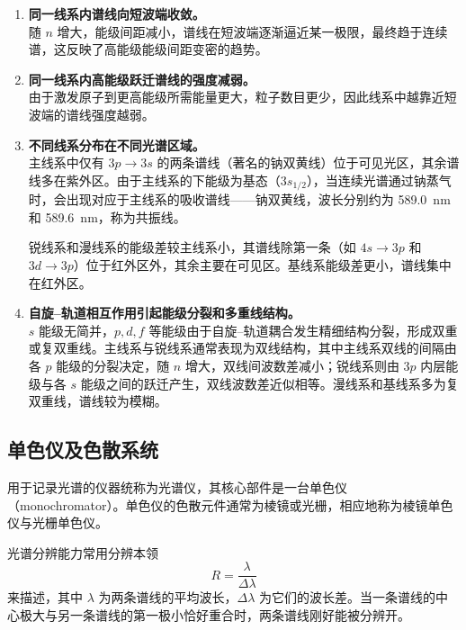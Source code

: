 \documentclass[a4paper,8pt,twocolumn]{article}
\begin{document}
\begin{enumerate}[label=(\arabic*)]
  \item \textbf{同一线系内谱线向短波端收敛。}\\
  随 $n$ 增大，能级间距减小，谱线在短波端逐渐逼近某一极限，最终趋于连续谱，这反映了高能级能级间距变密的趋势。

  \item \textbf{同一线系内高能级跃迁谱线的强度减弱。}\\
  由于激发原子到更高能级所需能量更大，粒子数目更少，因此线系中越靠近短波端的谱线强度越弱。

  \item \textbf{不同线系分布在不同光谱区域。}\\
  主线系中仅有 $3p \rightarrow 3s$ 的两条谱线（著名的钠双黄线）位于可见光区，其余谱线多在紫外区。由于主线系的下能级为基态（$3s_{1/2}$），当连续光谱通过钠蒸气时，会出现对应于主线系的吸收谱线——钠双黄线，波长分别约为 \SI{589.0}{\nano\meter} 和 \SI{589.6}{\nano\meter}，称为共振线。

  锐线系和漫线系的能级差较主线系小，其谱线除第一条（如 $4s\rightarrow 3p$ 和 $3d\rightarrow 3p$）位于红外区外，其余主要在可见区。基线系能级差更小，谱线集中在红外区。

  \item \textbf{自旋–轨道相互作用引起能级分裂和多重线结构。}\\
  $s$ 能级无简并，$p,d,f$ 等能级由于自旋–轨道耦合发生精细结构分裂，形成双重或复双重线。主线系与锐线系通常表现为双线结构，其中主线系双线的间隔由各 $p$ 能级的分裂决定，随 $n$ 增大，双线间波数差减小；锐线系则由 $3p$ 内层能级与各 $s$ 能级之间的跃迁产生，双线波数差近似相等。漫线系和基线系多为复双重线，谱线较为模糊。
\end{enumerate}

\subsection{单色仪及色散系统}

用于记录光谱的仪器统称为光谱仪，其核心部件是一台单色仪（monochromator）。单色仪的色散元件通常为棱镜或光栅，相应地称为棱镜单色仪与光栅单色仪。

光谱分辨能力常用分辨本领
\begin{equation}
  R = \frac{\lambda}{\Delta\lambda}
  \tag{E4.3}
\end{equation}
来描述，其中 $\lambda$ 为两条谱线的平均波长，$\Delta\lambda$ 为它们的波长差。当一条谱线的中心极大与另一条谱线的第一极小恰好重合时，两条谱线刚好能被分辨开。
\end{document}
